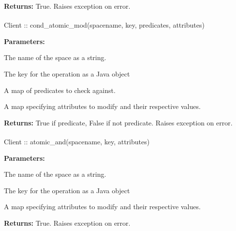 \noindent\textbf{Returns:}
True.  Raises exception on error.

\paragraph{}
\label{api:java:cond_atomic_mod}
\begin{javacode}
Client :: cond_atomic_mod(spacename, key, predicates, attributes)
\end{javacode}
\funcdesc 

\noindent\textbf{Parameters:}
\begin{description}[labelindent=\widthof{{\code{predicates}}},leftmargin=*,noitemsep,nolistsep,align=right]
\item[\code{spacename}] The name of the space as a string.
\item[\code{key}] The key for the operation as a Java object
\item[\code{predicates}] A map of predicates to check against.
\item[\code{attributes}] A map specifying attributes to modify and their respective values.
\end{description}

\noindent\textbf{Returns:}
True if predicate, False if not predicate.  Raises exception on error.

\paragraph{}
\label{api:java:atomic_and}
\begin{javacode}
Client :: atomic_and(spacename, key, attributes)
\end{javacode}
\funcdesc 

\noindent\textbf{Parameters:}
\begin{description}[labelindent=\widthof{{\code{attributes}}},leftmargin=*,noitemsep,nolistsep,align=right]
\item[\code{spacename}] The name of the space as a string.
\item[\code{key}] The key for the operation as a Java object
\item[\code{attributes}] A map specifying attributes to modify and their respective values.
\end{description}

\noindent\textbf{Returns:}
True.  Raises exception on error.

